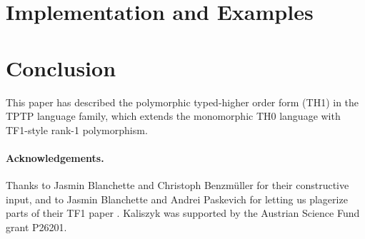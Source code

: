 \documentclass{easychair}
\begin{document}
\section{Implementation and Examples}
\label{ImplementationExamples}

\section{Conclusion}
\label{Conclusion}

This paper has described the polymorphic typed-higher order form (TH1)
in the TPTP language family, which extends the monomorphic TH0 language
with TF1-style rank-1 polymorphism.

\paragraph{Acknowledgements.}
Thanks to Jasmin Blanchette and Christoph Benzm{\"u}ller for their
constructive input, and to Jasmin Blanchette and Andrei Paskevich for
letting us plagerize parts of their TF1 paper \cite{BP13-TFF1}.
Kaliszyk was supported by the Austrian Science Fund grant P26201.



\end{document}

